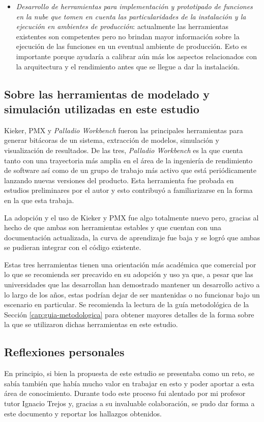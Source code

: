 \begin{itemize}
    \item \emph{Desarrollo de herramientas para implementación y prototipado de funciones en la nube que tomen en cuenta las particularidades de la instalación y la ejecución en ambientes de producción}: actualmente las herramientas existentes son competentes pero no brindan mayor información sobre la ejecución de las funciones en un eventual ambiente de producción. Esto es importante porque ayudaría a calibrar aún más los aspectos relacionados con la arquitectura y el rendimiento antes que se llegue a dar la instalación.
\end{itemize}

\subsection{Sobre las herramientas de modelado y simulación utilizadas en este estudio}
Kieker, PMX y \emph{Palladio Workbench} fueron las principales herramientas para generar bitácoras de un sistema, extracción de modelos, simulación y visualización de resultados. De las tres, \emph{Palladio Workbench} es la que cuenta tanto con una trayectoria más amplia en el área de la ingeniería de rendimiento de software así como de un grupo de trabajo más activo que está periódicamente lanzando nuevas versiones del producto. Esta herramienta fue probada en estudios preliminares por el autor y esto contribuyó a familiarizarse en la forma en la que esta trabaja.

La adopción y el uso de Kieker y PMX fue algo totalmente nuevo pero, gracias al hecho de que ambas son herramientas estables y que cuentan con una documentación actualizada, la curva de aprendizaje fue baja y se logró que ambas se pudieran integrar con el código existente.

Estas tres herramientas tienen una orientación más académica que comercial por lo que se recomienda ser precavido en su adopción y uso ya que, a pesar que las universidades que las desarrollan han demostrado mantener un desarrollo activo a lo largo de los años, estas podrían dejar de ser mantenidas o no funcionar bajo un escenario en particular. Se recomienda la lectura de la guía metodológica de la Sección \ref{cap:guia-metodologica} para obtener mayores detalles de la forma sobre la que se utilizaron dichas herramientas en este estudio.

\subsection{Reflexiones personales}
En principio, si bien la propuesta de este estudio se presentaba como un reto, se sabía también que había mucho valor en trabajar en esto y poder aportar a esta área de conocimiento. Durante todo este proceso fui alentado por mi profesor tutor Ignacio Trejos y, gracias a su invaluable colaboración, se pudo dar forma a este documento y reportar los hallazgos obtenidos.

